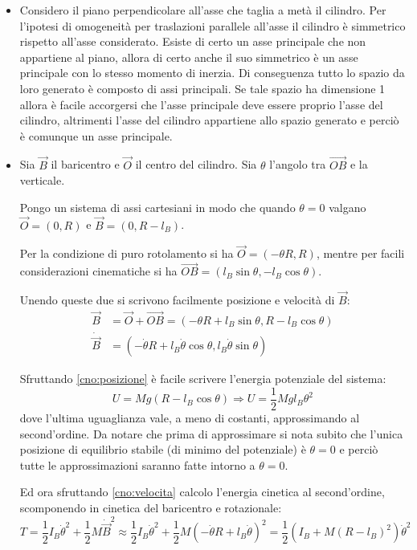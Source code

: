 \documentclass[../main.tex]{subfiles}
\begin{document}
\begin{itemize}
	\item Considero il piano perpendicolare all'asse che taglia a metà il cilindro. Per l'ipotesi di omogeneità per traslazioni parallele all'asse il cilindro è simmetrico rispetto all'asse considerato. Esiste di certo un asse principale che non appartiene al piano, allora di certo anche il suo simmetrico è un asse principale con lo stesso momento di inerzia. Di conseguenza tutto lo spazio da loro generato è composto di assi principali. Se tale spazio ha dimensione 1 allora è facile accorgersi che l'asse principale deve essere proprio l'asse del cilindro, altrimenti l'asse del cilindro appartiene allo spazio generato e perciò è comunque un asse principale.
	\item Sia $\vec B$ il baricentro e $\vec O$ il centro del cilindro. Sia $\theta$ l'angolo tra $\overrightarrow{OB}$ e la verticale.
	
	Pongo un sistema di assi cartesiani in modo che quando $\theta=0$ valgano $\vec O=(0,R)$ e $\vec B=(0,R-l_B)$.
	
	Per la condizione di puro rotolamento si ha $\vec O=(-\theta R, R)$, mentre per facili considerazioni cinematiche si ha $\overrightarrow{OB}=(l_B\sin\theta,-l_B\cos\theta)$.
	
	Unendo queste due si scrivono facilmente posizione e velocità di $\vec B$:
	\begin{align}
		\vec B &=\vec O+\overrightarrow{OB}=(-\theta R+l_B\sin\theta , R-l_B\cos\theta) \label{cno:posizione}\\
		\dot{\vec B} &= (-\dot\theta R+l_B\dot\theta\cos\theta, l_B\dot\theta\sin\theta) \label{cno:velocita}
	\end{align}
	
	Sfruttando \cref{cno:posizione} è facile scrivere l'energia potenziale del sistema:
	\begin{equation}\label{cno:potenziale}
		U=Mg(R-l_B\cos\theta) \Longrightarrow U=\frac12 Mgl_B\theta^2
	\end{equation}
	dove l'ultima uguaglianza vale, a meno di costanti, approssimando al second'ordine. Da notare che prima di approssimare si nota subito che l'unica posizione di equilibrio stabile (di minimo del potenziale) è $\theta=0$ e perciò tutte le approssimazioni saranno fatte intorno a $\theta=0$.
	
	Ed ora sfruttando \cref{cno:velocita} calcolo l'energia cinetica al second'ordine, scomponendo in cinetica del baricentro e rotazionale:
	\begin{equation}\label{cno:cinetica}
		T=\frac 12 I_B \dot\theta^2 +\frac 12 M\dot{\vec B}^2\approx 
		\frac 12 I_B \dot\theta^2 +\frac 12 M\left(-\dot\theta R+l_B\dot\theta\right)^2=
		\frac 12\left(I_B+M(R-l_B)^2\right)\dot\theta^2
	\end{equation}
	

\end{itemize}
\end{document}
